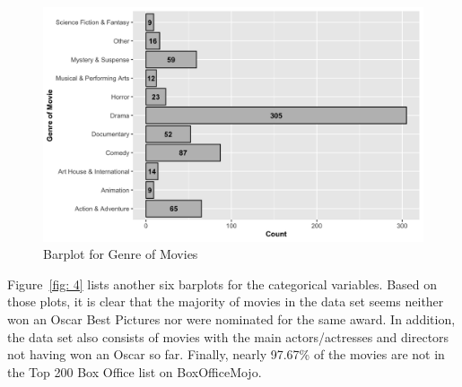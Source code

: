 \documentclass{article}
\begin{document}
\newpage

\begin{figure}[htbp]
\begin{center}
\includegraphics[scale=0.3]{barplot_genre.png}
\caption{Barplot for Genre of Movies }
\label{fig: 3}
\end{center}
\end{figure}

Figure~\ref{fig: 4} lists another six barplots for the categorical variables. Based on those plots, it is clear that the majority of movies in the data set seems neither won an Oscar Best Pictures nor were nominated for the same award. In addition, the data set also consists of movies with the main actors/actresses and directors not having won an Oscar so far. Finally, nearly 97.67\% of the movies are not  in the Top 200 Box Office list on BoxOfficeMojo. 
\end{document}
